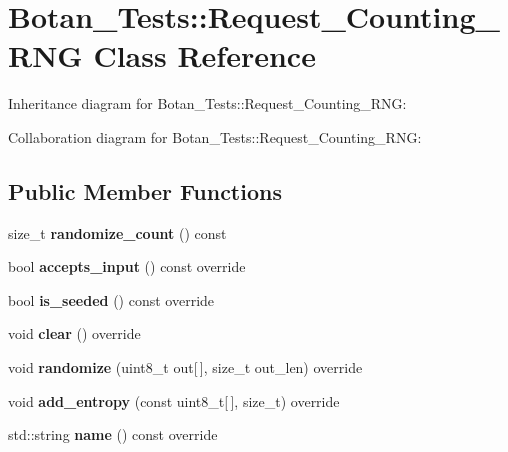 \hypertarget{class_botan___tests_1_1_request___counting___r_n_g}{}\section{Botan\+\_\+\+Tests\+:\+:Request\+\_\+\+Counting\+\_\+\+R\+NG Class Reference}
\label{class_botan___tests_1_1_request___counting___r_n_g}


Inheritance diagram for Botan\+\_\+\+Tests\+:\+:Request\+\_\+\+Counting\+\_\+\+R\+NG\+:


Collaboration diagram for Botan\+\_\+\+Tests\+:\+:Request\+\_\+\+Counting\+\_\+\+R\+NG\+:
\subsection*{Public Member Functions}
\begin{DoxyCompactItemize}
\item 
\mbox{\label{class_botan___tests_1_1_request___counting___r_n_g_a5c7c10a938841dc3558544a62818490c}} 
size\+\_\+t {\bfseries randomize\+\_\+count} () const
\item 
\mbox{\label{class_botan___tests_1_1_request___counting___r_n_g_a0e4c70e551297a4307c5552347520ca8}} 
bool {\bfseries accepts\+\_\+input} () const override
\item 
\mbox{\label{class_botan___tests_1_1_request___counting___r_n_g_aacf8c53a2d256a05ec7df6191b0ff869}} 
bool {\bfseries is\+\_\+seeded} () const override
\item 
\mbox{\label{class_botan___tests_1_1_request___counting___r_n_g_a7c669a70aa45514a0f9bbc1ab2ed88b5}} 
void {\bfseries clear} () override
\item 
\mbox{\label{class_botan___tests_1_1_request___counting___r_n_g_aaec52d5e9b85329873bf52dae487164f}} 
void {\bfseries randomize} (uint8\+\_\+t out\mbox{[}$\,$\mbox{]}, size\+\_\+t out\+\_\+len) override
\item 
\mbox{\label{class_botan___tests_1_1_request___counting___r_n_g_a8dd27141ce34fe51404eb318e73573a3}} 
void {\bfseries add\+\_\+entropy} (const uint8\+\_\+t\mbox{[}$\,$\mbox{]}, size\+\_\+t) override
\item 
\mbox{\label{class_botan___tests_1_1_request___counting___r_n_g_a76bb2c110aa267794d3bc2a66abbfe96}} 
std\+::string {\bfseries name} () const override
\end{DoxyCompactItemize}


